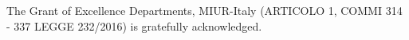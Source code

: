 \documentclass[journal=jacsat,manuscript=article]{achemso}
\newcommand*\mycommand[1]{\texttt{\emph{#1}}}
\begin{document}

\begin{acknowledgement}

The Grant of Excellence Departments, MIUR-Italy (ARTICOLO 1, COMMI 314 - 337 LEGGE 232/2016) is gratefully acknowledged.

\end{acknowledgement}
\end{document}
